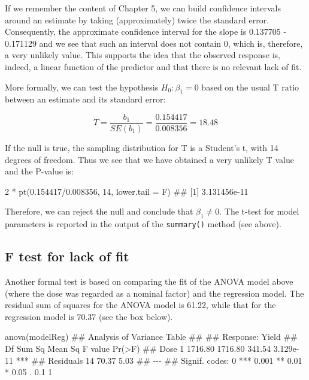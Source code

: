 \documentclass[a4paper,12pt,oneside]{book}
\newenvironment{Shaded}{\begin{snugshade}}{\end{snugshade}}
\newcommand{\DecValTok}[1]{#1}
\newcommand{\FloatTok}[1]{#1}
\newcommand{\SpecialCharTok}[1]{#1}
\newcommand{\DocumentationTok}[1]{#1}
\newcommand{\FunctionTok}[1]{#1}
\newcommand{\AttributeTok}[1]{#1}
\newcommand{\NormalTok}[1]{#1}
\begin{document}
If we remember the content of Chapter 5, we can build confidence intervals around an estimate by taking (approximately) twice the standard error. Consequently, the approximate confidence interval for the slope is 0.137705 - 0.171129 and we see that such an interval does not contain 0, which is, therefore, a very unlikely value. This supports the idea that the observed response is, indeed, a linear function of the predictor and that there is no relevant lack of fit.

More formally, we can test the hypothesis \(H_0: \beta_1 = 0\) based on the usual T ratio between an estimate and its standard error:

\[T = \frac{b_1}{SE(b_1)} = \frac{0.154417}{0.008356} = 18.48\]

If the null is true, the sampling distribution for T is a Student's t, with 14 degrees of freedom. Thus we see that we have obtained a very unlikely T value and the P-value is:

\begin{Shaded}
\begin{Highlighting}[]
\DecValTok{2} \SpecialCharTok{*} \FunctionTok{pt}\NormalTok{(}\FloatTok{0.154417}\SpecialCharTok{/}\FloatTok{0.008356}\NormalTok{, }\DecValTok{14}\NormalTok{, }\AttributeTok{lower.tail =}\NormalTok{ F)}
\DocumentationTok{\#\# [1] 3.131456e{-}11}
\end{Highlighting}
\end{Shaded}

Therefore, we can reject the null and conclude that \(\beta_1 \ne 0\). The t-test for model parameters is reported in the output of the \texttt{summary()} method (see above).

\hypertarget{f-test-for-lack-of-fit}{%
\subsection{F test for lack of fit}\label{f-test-for-lack-of-fit}}

Another formal test is based on comparing the fit of the ANOVA model above (where the dose was regarded as a nominal factor) and the regression model. The residual sum of squares for the ANOVA model is 61.22, while that for the regression model is 70.37 (see the box below).

\begin{Shaded}
\begin{Highlighting}[]
\FunctionTok{anova}\NormalTok{(modelReg)}
\DocumentationTok{\#\# Analysis of Variance Table}
\DocumentationTok{\#\# }
\DocumentationTok{\#\# Response: Yield}
\DocumentationTok{\#\#           Df  Sum Sq Mean Sq F value    Pr(\textgreater{}F)    }
\DocumentationTok{\#\# Dose       1 1716.80 1716.80  341.54 3.129e{-}11 ***}
\DocumentationTok{\#\# Residuals 14   70.37    5.03                      }
\DocumentationTok{\#\# {-}{-}{-}}
\DocumentationTok{\#\# Signif. codes:  0 \textquotesingle{}***\textquotesingle{} 0.001 \textquotesingle{}**\textquotesingle{} 0.01 \textquotesingle{}*\textquotesingle{} 0.05 \textquotesingle{}.\textquotesingle{} 0.1 \textquotesingle{} \textquotesingle{} 1}
\end{Highlighting}
\end{Shaded}
\end{document}

